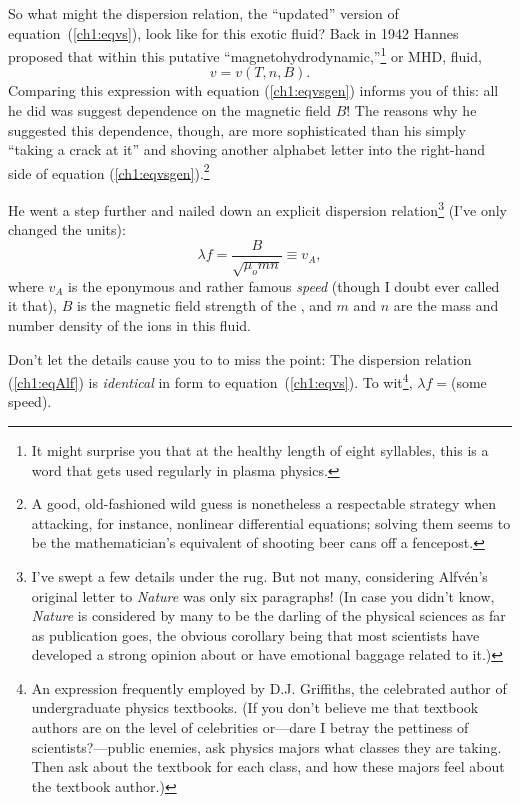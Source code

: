 So what might the dispersion relation, the ``updated'' version of
equation~(\ref{ch1:eqvs}), look like for this exotic fluid? Back in
1942 Hannes \Alf proposed that within this putative
``magnetohydrodynamic,''\footnote{It might surprise you that at the
  healthy length of eight syllables, this is a word that gets used
  regularly in plasma physics.} or MHD, fluid,
\begin{equation}
  \label{ch1:eqmhd}
  v = v ( T, n, B).
\end{equation}
Comparing this expression with equation (\ref{ch1:eqvsgen}) informs
you of this: all he did was suggest dependence on the magnetic field
$B$!  The reasons why he suggested this dependence, though, are more
sophisticated than his simply ``taking a crack at it'' and shoving
another alphabet letter into the right-hand side of equation
(\ref{ch1:eqvsgen}).\footnote{A good, old-fashioned wild guess is
  nonetheless a respectable strategy when attacking, for instance,
  nonlinear differential equations; solving them seems to be the
  mathematician's equivalent of shooting beer cans off a fencepost.}

He went a step further and nailed down an explicit dispersion
relation\footnote{I've swept a few details under the rug. But not
  many, considering Alfv\'{e}n's original letter to \textsl{Nature}
  was only six paragraphs! (In case you didn't know, \textsl{Nature}
  is considered by many to be the darling of the physical sciences as
  far as publication goes, the obvious corollary being that most
  scientists have developed a strong opinion about or have emotional
  baggage related to it.)} (I've only changed the units):
\begin{equation}
  \label{ch1:eqAlf}
  \lambda f = \frac{B}{\sqrt{\mu_o m n}} \equiv v_A,
\end{equation}
where $v_A$ is the eponymous and rather famous \textsl{\Alf speed}
(though I doubt \Alf ever called it that), $B$ is the magnetic field
strength of the , and $m$ and $n$ are the mass and number density of
the ions in this fluid.

Don't let the details cause you to to miss the point: The dispersion
relation (\ref{ch1:eqAlf}) is \emph{identical} in form to
equation~(\ref{ch1:eqvs}). To wit\footnote{An expression frequently
  employed by D.J. Griffiths, the celebrated author of undergraduate
  physics textbooks. (If you don't believe me that textbook authors
  are on the level of celebrities or---dare I betray the pettiness of
  scientists?---public enemies, ask physics majors what classes they
  are taking. Then ask about the textbook for each class, and how
  these majors feel about the textbook author.)}, $ \lambda f = $(some
speed). 

